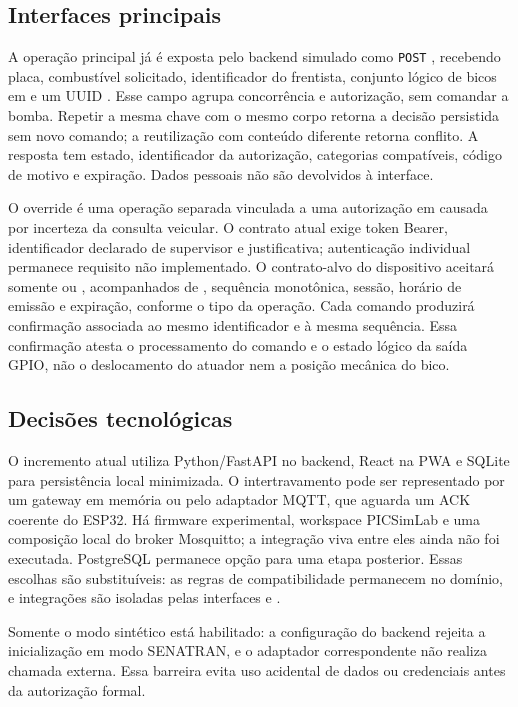 \subsection{Interfaces principais}

A operação principal já é exposta pelo backend simulado como
\texttt{POST} , recebendo placa, combustível solicitado,
identificador do frentista, conjunto lógico de bicos em  e um UUID
. Esse campo agrupa concorrência e autorização, sem
comandar a bomba. Repetir a
mesma chave com o mesmo corpo retorna a decisão persistida sem novo comando; a
reutilização com conteúdo diferente retorna conflito. A resposta tem estado,
identificador da autorização, categorias compatíveis, código de motivo e
expiração. Dados pessoais não são devolvidos à interface.

O override é uma operação separada vinculada a uma autorização em
 causada por incerteza da consulta veicular. O contrato
atual exige token Bearer, identificador declarado de supervisor e justificativa;
autenticação individual permanece requisito não implementado. O contrato-alvo
do dispositivo aceitará somente
 ou , acompanhados de
, sequência monotônica, sessão, horário de emissão e
expiração, conforme o tipo da operação. Cada comando produzirá confirmação
associada ao mesmo identificador e à mesma sequência. Essa confirmação atesta o
processamento do comando e o estado lógico da saída GPIO, não o deslocamento do
atuador nem a posição mecânica do bico.

\subsection{Decisões tecnológicas}

O incremento atual utiliza Python/FastAPI no backend, React na PWA e SQLite para
persistência local minimizada. O intertravamento pode ser representado por um
gateway em memória ou pelo adaptador MQTT, que aguarda um ACK coerente do ESP32. Há
firmware experimental, workspace PICSimLab e uma composição local do broker
Mosquitto; a integração viva entre eles ainda não foi executada. PostgreSQL
permanece opção para uma etapa posterior. Essas escolhas são
substituíveis: as regras de compatibilidade permanecem no domínio, e integrações
são isoladas pelas interfaces  e
.

Somente o modo sintético está habilitado: a configuração do backend rejeita a
inicialização em modo SENATRAN, e o adaptador correspondente não realiza chamada
externa. Essa barreira evita uso acidental de dados ou credenciais antes da
autorização formal.

